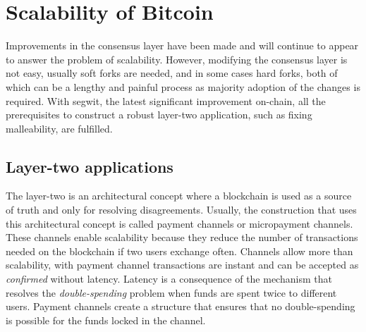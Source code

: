 \section{Scalability of Bitcoin}

Improvements in the consensus layer have been made and will continue to appear
to answer the problem of scalability. However, modifying the consensus layer is
not easy, usually soft forks are needed, and in some cases hard forks, both of which
can be a lengthy and painful process as majority adoption of the changes is required. With
\gls{segwit}, the latest significant improvement on-chain, all the prerequisites
to construct a robust layer-two application, such as fixing malleability, are
fulfilled.

\subsection{Layer-two applications}

The layer-two is an architectural concept where a blockchain is used as a source
of truth and only for resolving disagreements. Usually, the construction that
uses this architectural concept is called payment channels or micropayment
channels. These channels enable scalability because they reduce the number of
transactions needed on the blockchain if two users exchange often.
Channels allow more than scalability, with payment channel transactions are
instant and can be accepted as \textit{confirmed} without latency. Latency is a
consequence of the mechanism that resolves the \textit{double-spending} problem
when funds are spent twice to different users. Payment channels create a
structure that ensures that no double-spending is possible for the funds locked
in the channel.
